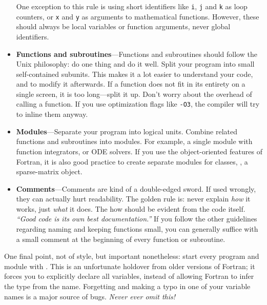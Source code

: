\begin{itemize}
    One exception to this rule is using short identifiers like \texttt{i}, \texttt{j} and \texttt{k} as loop counters, or \texttt{x} and \texttt{y} as arguments to mathematical functions.
    However, these should always be local variables or function arguments, never global identifiers.
  \item\textbf{Functions and subroutines}---Functions and subroutines should follow the Unix philosophy: do one thing and do it well.
    Split your program into small self-contained subunits.
    This makes it a lot easier to understand your code, and to modify it afterwards.
    If a function does not fit in its entirety on a single screen, it is too long---split it up.
    Don't worry about the overhead of calling a function.
    If you use optimization flags like \texttt{-O3}, the compiler will try to inline them anyway.
  \item\textbf{Modules}---Separate your program into logical units.
    Combine related functions and subroutines into modules.
    For example, a single module with function integrators, or ODE solvers. 
    If you use the object-oriented features of Fortran, it is also good practice to create separate modules for classes, \eg, a sparse-matrix object.
  \item\textbf{Comments}---Comments are kind of a double-edged sword.
    If used wrongly, they can actually hurt readability.
    The golden rule is: never explain \emph{how} it works, just \emph{what} it does.
    The how should be evident from the code itself.
    \emph{``Good code is its own best documentation.''} If you follow the other guidelines regarding naming and keeping functions small, you can generally suffice with a small comment at the beginning of every function or subroutine.
\end{itemize}
One final point, not of style, but important nonetheless: start every program and module with .
This is an unfortunate holdover from older versions of Fortran; it forces you to explicitly declare all variables, instead of allowing Fortran to infer the type from the name.
Forgetting  and making a typo in one of your variable names is a major source of bugs.
\emph{Never ever omit this!}
